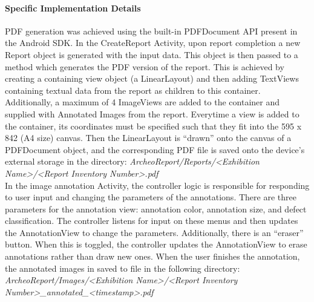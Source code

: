 \documentclass[12pt]{article}
\begin{document}
\paragraph{Specific Implementation Details}
PDF generation was achieved using the built-in PDFDocument API present in the Android SDK. In the CreateReport Activity, upon report completion a new Report object is generated with the input data. This object is then passed to a method which generates the PDF version of the report. This is achieved by creating a containing view object (a LinearLayout) and then adding TextViews containing textual data from the report as children to this container. Additionally, a maximum of 4 ImageViews are added to the container and supplied with Annotated Images from the report. Everytime a view is added to the container, its coordinates must be specified such that they fit into the 595 x 842 (A4 size) canvas. Then the LinearLayout is ``drawn'' onto the canvas of a PDFDocument object, and the corresponding PDF file is saved onto the device's external storage in the directory: \textit{ArcheoReport/Reports/<Exhibition Name>/<Report Inventory Number>.pdf} \\

In the image annotation Activity, the controller logic is responsible for responding to user input and changing the parameters of the annotations. There are three parameters for the annotation view: annotation color, annotation size, and defect classification. The controller listens for input on these menus and then updates the AnnotationView to change the parameters. Additionally, there is an ``eraser'' button. When this is toggled, the controller updates the AnnotationView to erase annotations rather than draw new ones. When the user finishes the annotation, the annotated images in saved to file in the following directory: \textit{ArcheoReport/Images/<Exhibition Name>/<Report Inventory Number>\_annotated\_<timestamp>.pdf} \\
\end{document}
